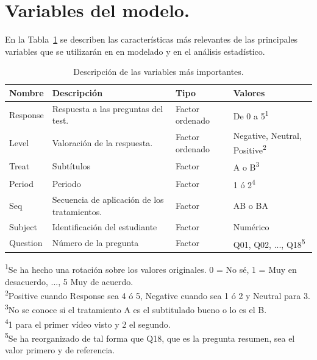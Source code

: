 \documentclass[
  12pt,
  a4paper,
  extrafontsizes,
  onecolumn,
  openright]{memoir}
\begin{document}
\hypertarget{variables}{%
\section{Variables del modelo.}\label{variables}}

En la Tabla~\ref{tbl-variables} se describen las características más
relevantes de las principales variables que se utilizarán en en modelado
y en el análisis estadístico.

\footnotesize

\hypertarget{tbl-variables}{}
\setlength{\LTpost}{0mm}
\begin{longtable}{llll}
\caption{\label{tbl-variables}Descripción de las variables más importantes. }\tabularnewline

\toprule
Nombre & Descripción & Tipo & Valores \\ 
\midrule
Response & Respuesta a las preguntas del test. & Factor ordenado & De 0 a 5\textsuperscript{1} \\ 
Level & Valoración de la respuesta. & Factor ordenado & Negative, Neutral, Positive\textsuperscript{2} \\ 
Treat & Subtítulos & Factor & A o B\textsuperscript{3} \\ 
Period & Periodo & Factor & 1 ó 2\textsuperscript{4} \\ 
Seq & Secuencia de aplicación de los tratamientos. & Factor & AB o BA \\ 
Subject & Identificación del estudiante & Factor & Numérico \\ 
Question & Número de la pregunta & Factor & Q01, Q02, ..., Q18\textsuperscript{5} \\ 
\bottomrule
\end{longtable}
\begin{minipage}{\linewidth}
\textsuperscript{1}Se ha hecho una rotación sobre los valores originales. 0 = No sé, 1 = Muy en desacuerdo, ..., 5 Muy de acuerdo.\\
\textsuperscript{2}Positive cuando Response sea 4 ó 5, Negative cuando sea 1 ó 2 y Neutral para 3.\\
\textsuperscript{3}No se conoce si el tratamiento A es el subtitulado bueno o lo es el B.\\
\textsuperscript{4}1 para el primer vídeo visto y 2 el segundo.\\
\textsuperscript{5}Se ha reorganizado de tal forma que Q18, que es la pregunta resumen, sea el valor primero y de referencia.\\
\end{minipage}
\end{document}
